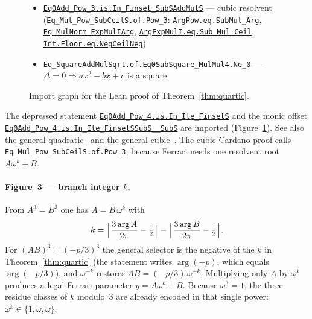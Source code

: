 \documentclass[11pt,a4paper]{article}
\newcommand{\Arg}{\operatorname{arg}}
\begin{document}
\begin{figure}[ht]
\begin{itemize}[leftmargin=1.2em,itemsep=0.15em]
\begin{itemize}[leftmargin=1.1em,itemsep=0.1em]
\begin{itemize}[leftmargin=1.1em,itemsep=0.05em]
      \begin{itemize}[leftmargin=1.1em,itemsep=0.05em]
        \item \href{http://www.lemma.cn/lean/?module=Complex.Eq0Add_Pow_3.is.In_Finset_SubSAddMulS}{\texttt{Eq0Add\_Pow\_3.is.In\_Finset\_SubSAddMulS}} --- cubic resolvent
        (\href{http://www.lemma.cn/lean/?module=Complex.Eq_Mul_Pow_SubCeilS.of.Pow_3}{\texttt{Eq\_Mul\_Pow\_SubCeilS.of.Pow\_3}}:
        \href{http://www.lemma.cn/lean/?module=Complex.ArgPow.eq.SubMul_Arg}{\texttt{ArgPow.eq.SubMul\_Arg}},
        \href{http://www.lemma.cn/lean/?module=Complex.Eq_MulNorm_ExpMulIArg}{\texttt{Eq\_MulNorm\_ExpMulIArg}},
        \href{http://www.lemma.cn/lean/?module=Complex.ArgExpMulI.eq.Sub_Mul_Ceil}{\texttt{ArgExpMulI.eq.Sub\_Mul\_Ceil}},
        \href{http://www.lemma.cn/lean/?module=Int.Floor.eq.NegCeilNeg}{\texttt{Int.Floor.eq.NegCeilNeg}})
        \item \href{http://www.lemma.cn/lean/?module=Complex.Eq_SquareAddMulSqrt.of.Eq0SubSquare_MulMul4.Ne_0}{\texttt{Eq\_SquareAddMulSqrt.of.Eq0SubSquare\_MulMul4.Ne\_0}} --- \(\Delta=0\Rightarrow ax^2+bx+c\) is a square
      \end{itemize}
    \end{itemize}
  \end{itemize}
\end{itemize}
\caption{Import graph for the Lean proof of Theorem~\ref{thm:quartic}.}
\label{fig:deps}
\end{figure}

The depressed statement
\href{http://www.lemma.cn/lean/?module=Complex.Eq0Add_Pow_4.is.In_Ite_FinsetS}{\texttt{Eq0Add\_Pow\_4.is.In\_Ite\_FinsetS}}
and the monic offset
\href{http://www.lemma.cn/lean/?module=Complex.Eq0Add_Pow_4.is.In_Ite_FinsetSSubS__SubS}{\texttt{Eq0Add\_Pow\_4.is.In\_Ite\_FinsetSSubS\_\_SubS}}
are imported (Figure~\ref{fig:deps}).
See also the general quadratic~\cite{lemma_quadratic_lean} and the general cubic~\cite{lemma_cubic_lean}.
The cubic Cardano proof calls \texttt{Eq\_Mul\_Pow\_SubCeilS.of.Pow\_3}, because Ferrari needs one resolvent root \(A\omega^{k}+B\).

\paragraph{Figure~3 --- branch integer \(k\).}
From \(A^3=B^3\) one has \(A=B\,\omega^{k}\) with
\[
k=\Bigl\lceil\frac{3\Arg A}{2\pi}-\tfrac12\Bigr\rceil
-\Bigl\lceil\frac{3\Arg B}{2\pi}-\tfrac12\Bigr\rceil.
\]
For \((AB)^3=(-p/3)^3\) the general selector is the negative of the \(k\) in Theorem~\ref{thm:quartic} (the statement writes \(\Arg(-p)\), which equals \(\Arg(-p/3)\)), and \(\omega^{-k}\) restores \(AB=(-p/3)\,\omega^{-k}\).
Multiplying only \(A\) by \(\omega^{k}\) produces a legal Ferrari parameter \(y=A\omega^{k}+B\).
Because \(\omega^{3}=1\), the three residue classes of \(k\) modulo~3 are already encoded in that single power: \(\omega^{k}\in\{1,\omega,\overline{\omega}\}\).
\end{document}

